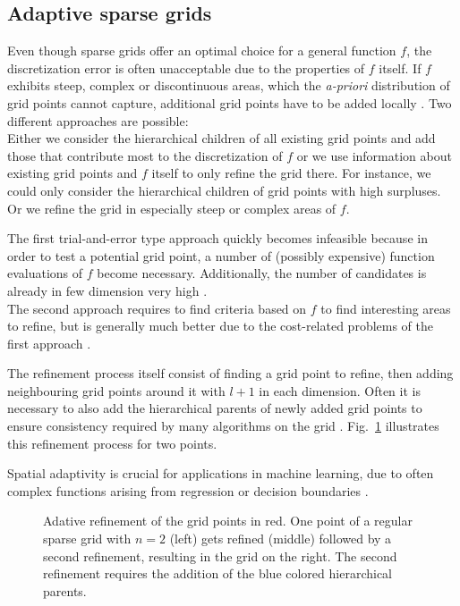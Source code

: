 \subsection{Adaptive sparse grids}\label{subsec:ada}

Even though sparse grids offer an optimal choice for a general function $f$,
the discretization error is often unacceptable due to
the properties of $f$ itself. If $f$ exhibits steep, complex
or discontinuous areas, which the \emph{a-priori} distribution of grid points
cannot capture, additional grid points have to be added locally
\cite{disspfl}.
Two different approaches are possible: \\
Either we consider the hierarchical children of all existing grid points
and add those that contribute most to the discretization of $f$
or we use information about existing grid points and $f$ itself to
only refine the grid there. For instance, we could only consider the
hierarchical children of grid points with high surpluses. Or we refine
the grid in especially steep or complex areas of $f$.
\par
The first trial-and-error type approach quickly becomes infeasible
because in order to test a potential grid point, a number of
(possibly expensive) function evaluations of $f$ become necessary.
Additionally, the number of candidates is already in few dimension very
high \cite{disspfl}. \\
The second approach requires to find criteria based on $f$ to
find interesting areas to refine, but is generally much better due to the
cost-related problems of the first approach \cite{disspfl}.
\par
The refinement process itself consist of finding a grid point to refine,
then adding neighbouring grid points around it with $l + 1$ in each dimension.
Often it is necessary to also add the hierarchical parents of newly added
grid points to ensure consistency required by many algorithms on the grid
\cite{disspfl}.
Fig.~\ref{fig:fig3} illustrates this refinement process for two points.
\par
Spatial adaptivity is crucial for applications in machine learning, due to
often complex functions arising from regression or decision boundaries
\cite{disspfl, artbunshort}.

\begin{figure}[t!]
  \centering
  
  \hspace{20px}
  
  \hspace{20px}
  
  \captionsetup{width=0.65\textwidth}
  \caption{Adative refinement of the grid points in red. One point
    of a regular sparse grid with $n = 2$ (left) gets refined (middle)
    followed by a second refinement, resulting in the grid on the right.
    The second refinement requires the addition of the blue
    colored hierarchical parents.
    \label{fig:fig3}}
\end{figure}


